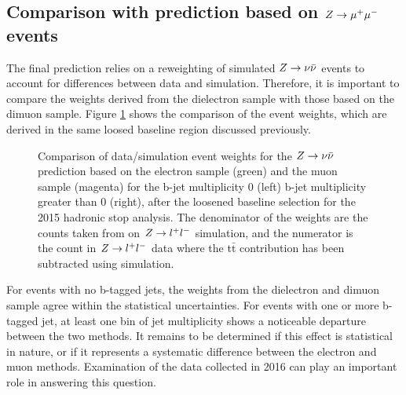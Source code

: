 \subsection{Comparison with prediction based on $Z\rightarrow \mu^+\mu^-$ events}
The final prediction relies on a reweighting of simulated $Z\rightarrow \nu\bar{\nu}$ events to account for differences between data and simulation. Therefore, it is important to compare the weights derived from the dielectron sample with those based on the dimuon sample. Figure \ref{fig:ZInvWeights} shows the comparison of the event weights, which are derived in the same loosed baseline region discussed previously. 
\begin{figure}[h]
\centering
{}
\caption{Comparison of data/simulation event weights for the $Z\rightarrow \nu\bar{\nu}$ prediction based on the electron sample (green) and the muon sample (magenta) for the b-jet multiplicity 0 (left) b-jet multiplicity greater than 0 (right), after the loosened baseline selection for the 2015 hadronic stop analysis. The denominator of the weights are the counts taken from on $Z\rightarrow l^+l^-$ simulation, and the numerator is the count in $Z\rightarrow l^+l^-$ data where the t$\bar{\text{t}}$ contribution has been subtracted using simulation. }
\label{fig:ZInvWeights}
\end{figure}
For events with no b-tagged jets, the weights from the dielectron and dimuon sample agree within the statistical uncertainties. For events with one or more b-tagged jet, at least one bin of jet multiplicity shows a noticeable departure between the two methods. It remains to be determined if this effect is statistical in nature, or if it represents a systematic difference between the electron and muon methods. Examination of the data collected in 2016 can play an important role in answering this question.

